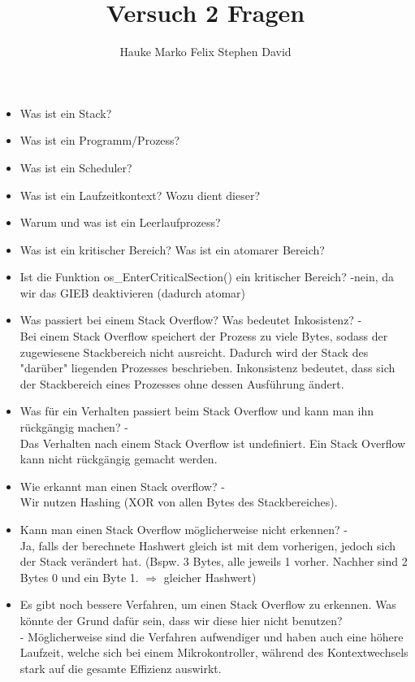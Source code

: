 \documentclass[12pt,a4paper]{article}
\title{Versuch 2 Fragen}
\author{Hauke Marko Felix Stephen David}
\begin{document}
\maketitle

\begin{itemize}
\item Was ist ein Stack?
\item Was ist ein Programm/Prozess?
\item Was ist ein Scheduler?
\item Was ist ein Laufzeitkontext? Wozu dient dieser?
\item Warum und was ist ein Leerlaufprozess?
\item Was ist ein kritischer Bereich? Was ist ein atomarer Bereich?
\item Ist die Funktion os\_EnterCriticalSection() ein kritischer Bereich? -nein, da wir das GIEB deaktivieren (dadurch atomar)
\item Was passiert bei einem Stack Overflow? Was bedeutet Inkosistenz? -\\
      Bei einem Stack Overflow speichert der Prozess zu viele Bytes, sodass der zugewiesene Stackbereich nicht ausreicht. Dadurch wird der Stack des "darüber" liegenden Prozesses beschrieben. Inkonsistenz bedeutet, dass sich der Stackbereich eines Prozesses ohne dessen Ausführung ändert.
\item Was für ein Verhalten passiert beim Stack Overflow und kann man ihn rückgängig machen? -\\
      Das Verhalten nach einem Stack Overflow ist undefiniert. Ein Stack Overflow kann nicht rückgängig gemacht werden.
\item Wie erkannt man einen Stack overflow? -\\
      Wir nutzen Hashing (XOR von allen Bytes des Stackbereiches).
\item Kann man einen Stack Overflow möglicherweise nicht erkennen? -\\
      Ja, falls der berechnete Hashwert gleich ist mit dem vorherigen, jedoch sich der Stack verändert hat. (Bspw. 3 Bytes, alle jeweils 1 vorher. Nachher sind 2 Bytes 0 und ein Byte 1. $\Rightarrow$ gleicher Hashwert)
\item Es gibt noch bessere Verfahren, um einen Stack Overflow zu erkennen. Was könnte der Grund dafür sein, dass wir diese hier nicht benutzen?\\-
      Möglicherweise sind die Verfahren aufwendiger und haben auch eine höhere Laufzeit, welche sich bei einem Mikrokontroller, während des Kontextwechsels stark auf die gesamte Effizienz auswirkt.

\end{itemize}
\end{document}
